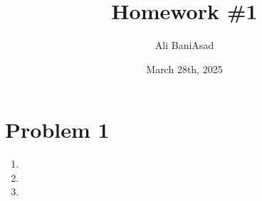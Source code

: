 \documentclass[12]{fphw}
\title{Homework \#1} %
\author{Ali BaniAsad} %
\date{March 28th, 2025} %
\institute{Sharif University of Technology \\ Institute of Aerospace} %
\begin{document}
\maketitle %
\section*{Problem 1}

\begin{enumerate}[label=(\alph*)]
	\item 
	
	\newpage
	\item 
	
	\newpage
	\item 
	
\end{enumerate}
\end{document}
